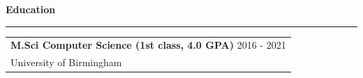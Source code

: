 \documentclass[letterpaper,11pt]{article}
\makeatletter
\newcommand{\resheading}[1]{
  {
    \flushleft
    {\Large \textbf{#1}}
    \vspace{-6pt}
    \par\noindent\rule{\textwidth}{0.4pt}
    \vspace{2pt}
  }
}
\newcommand{\ressubheading}[4]{
\begin{tabular*}{6.5in}{l@{\cftdotfill{\cftsecdotsep}\extracolsep{\fill}}r}
		\multicolumn{2}{c}{\textbf{#1}  \cftdotfill{\cftdotsep} #2} \\
		#3 & \texttt{#4} \\
\end{tabular*}\vspace{-6pt}}
\makeatother
\begin{document}
\vspace{4pt}

\resheading{Education}

\vspace{-8pt}

{\small

\ressubheading{M.Sci Computer Science (1st class, 4.0 GPA)}{2016 - 2021}{University of Birmingham}{}

}




\end{document}
